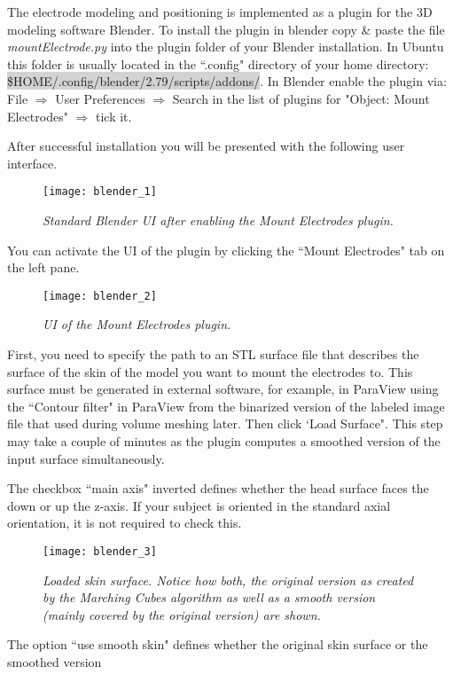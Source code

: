 The electrode modeling and positioning is implemented as a plugin for the 3D modeling software Blender.
To install the plugin in blender copy \& paste the file \emph{mountElectrode.py} into the plugin folder
of your Blender installation. In Ubuntu this folder is usually located in the ``.config" directory
of your home directory:
\newline
\colorbox{lightgray}{\$HOME/.config/blender/2.79/scripts/addons/}.
\newline
In Blender enable the plugin via: File $\Rightarrow$ User Preferences $\Rightarrow$ Search in the list
of plugins for "Object: Mount Electrodes" $\Rightarrow$ tick it.
\par
After successful installation you will be presented with the following user interface.
\begin{figure}[H]
   \centering
   \texttt{[image: blender\_1]}
   \caption{\emph{Standard Blender UI after enabling the Mount Electrodes plugin.}}
\end{figure}
You can activate the UI of the plugin by clicking the ``Mount Electrodes" tab on the left pane.
\begin{figure}[H]
   \centering
   \texttt{[image: blender\_2]}
   \caption{\emph{UI of the Mount Electrodes plugin.}}
\end{figure}
First, you need to specify the path to an STL surface file that describes the surface of the skin
of the model you want to mount the electrodes to. This surface must be generated in external software,
for example, in ParaView using the ``Contour filter" in ParaView from the binarized version of the
labeled image file that used during volume meshing later. Then click `Load Surface".
This step may take a couple of minutes as the plugin computes a smoothed version of the input surface
simultaneously.\par
The checkbox ``main axis" inverted defines whether the head surface faces the down or up the z-axis.
If your subject is oriented in the standard axial orientation, it is not required to check this.\par
\begin{figure}[H]
   \centering
   \texttt{[image: blender\_3]}
   \caption{\emph{Loaded skin surface. Notice how both, the original version as created by the
                  Marching Cubes algorithm as well as a smooth version (mainly covered by the
                  original version) are shown.}}
\end{figure}
The option ``use smooth skin" defines whether the original skin surface or the smoothed version
